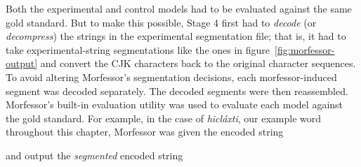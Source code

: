 Both the experimental and control models had to be evaluated against the same gold standard.
But to make this possible, Stage 4 first had to \emph{decode} (or \emph{decompress}) the strings in the experimental segmentation file; that is, it had to take experimental-string segmentations like the ones in 
figure~\ref{fig:morfessor-output} and convert the CJK characters back to the original character sequences.
To avoid altering Morfessor’s segmentation decisions, 
each morfessor-induced segment 
was decoded separately. The decoded segments were then reassembled. 
Morfessor's built-in evaluation utility was used to evaluate each model against the gold standard. 
For example, 
in the case of \textit{hicl\'{a}xti}, our example word throughout this chapter, 
Morfessor was given the encoded string 
\begin{center}
\end{center}
and output the \emph{segmented} encoded string
\begin{center}
\end{center}
